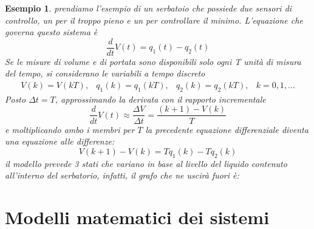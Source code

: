 \documentclass{book}
\newtheorem{esempio}{Esempio}
\begin{document}
\begin{esempio}
  prendiamo l'esempio di un serbatoio che possiede due sensori di controllo, un per il troppo
  pieno e un per controllare il minimo. L'equazione che governa questo sistema è
  \begin{equation}
    \frac{d}{dt}V(t)=q_1(t)-q_2(t)
  \end{equation}
  Se le misure di volume e di portata sono disponibili solo ogni {\it T} unità di misura
  del tempo, si considerano le variabili a tempo discreto
  \begin{equation*}
    \begin{matrix}
      V(k)=V(kT), & q_1(k)=q_1(kT), & q_2(k)=q_2(kT), & k=0,1,\dots
    \end{matrix}
  \end{equation*}
  Posto $\Delta t=T$, approssimando la derivata con il rapporto incrementale
  \begin{equation*}
    \frac{d}{dt}V(t)\approx\frac{\Delta V}{\Delta t}=\frac{(k+1)-V(k)}{T}
  \end{equation*}
  e moltiplicando ambo i membri per $T$ la precedente equazione differenziale diventa una
  equazione alle differenze:
  \begin{equation*}
    V(k+1)-V(k)=Tq_1(k)-Tq_2(k)
  \end{equation*}
  il modello prevede 3 stati che variano in base al livello del liquido contenuto all'interno
  del serbatorio, infatti, il grafo che ne uscirà fuori è:
  \begin{figure}[!h]
  \end{figure} 
\end{esempio}
\chapter {Modelli matematici dei sistemi}
\end{document}
